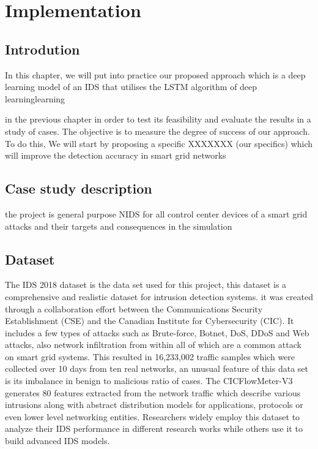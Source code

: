 




\chapter{Implementation} \label{chap:Implementation}
\section{Introdution}
In this chapter, we will put into practice our proposed approach which is a deep learning model of an IDS that utilises the LSTM algorithm of deep learninglearning

in the previous chapter in order to test its feasibility and evaluate the results in a study of cases. The objective is to measure the degree of success of our approach. To do this, We will start by proposing a specific 
XXXXXXX (our specifics)
which will improve the detection accuracy in smart grid networks






\section{Case study description}
the project is general purpose NIDS for all control center devices of a smart grid
attacks and their targets and consequences in the simulation






\section{Dataset}
The IDS 2018 dataset is the data set used for this project, this dataset is a comprehensive and realistic dataset for intrusion detection systems. it was created through a collaboration effort between the Communications Security Establishment (CSE) and the Canadian Institute for Cybersecurity (CIC). It includes a few types of attacks such as Brute-force, Botnet, DoS, DDoS and Web attacks, also network infiltration from within all of which are a common attack on smart grid systems. This resulted in 16,233,002 traffic samples which were collected over 10 days from ten real networks, an unusual feature of this data set is its imbalance in benign to malicious ratio of cases. The CICFlowMeter-V3 generates 80 features extracted from the network traffic which describe various intrusions along with abstract distribution models for applications, protocols or even lower level networking entities. Researchers widely employ this dataset to analyze their IDS performance in different research works while others use it to build advanced IDS models.




